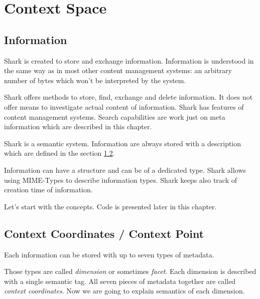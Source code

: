 \chapter{Context Space}
\label{sec:contextspace}
\section{Information}
Shark is created to store and exchange information. Information is understood in the same way as in most other content management systems: an arbitrary number of bytes which won't be interpreted by the system. 

Shark offers methods to store, find, exchange and delete information. It does not offer means to investigate actual content of information. Shark has features of content management systems. Search capabilities are work just on meta information which are described in this chapter.

Shark is a semantic system. Information are always stored with a description which are defined in the section \ref{section:informationcontext}. 

Information can have a structure and can be of a dedicated type. Shark allows using MIME-Types to describe information types. Shark keeps also track of creation time of information.

Let's start with the concepts. Code is presented later in this chapter.

\section{Context Coordinates / Context Point}
\label{section:informationcontext}
Each information can be stored with up to seven types of metadata. 

Those types are called {\it dimension} or sometimes {\it facet}. Each dimension is described with a single semantic tag. All seven pieces of metadata together are called {\it context coordinates}. 
Now we are going to explain semantics of each dimension. 

